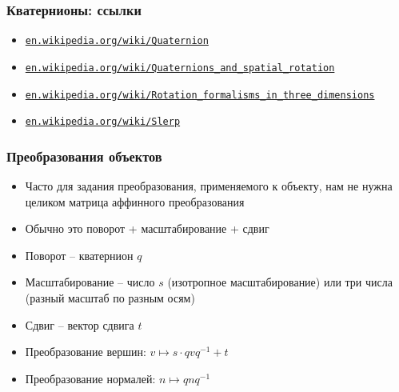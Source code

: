 \documentclass{beamer}
\begin{document}
\begin{frame}[fragile]
\frametitle{Кватернионы: ссылки}
\begin{itemize}
\item \href{https://en.wikipedia.org/wiki/Quaternion}{\nolinkurl{en.wikipedia.org/wiki/Quaternion}}
\item \href{https://en.wikipedia.org/wiki/Quaternions_and_spatial_rotation}{\nolinkurl{en.wikipedia.org/wiki/Quaternions\_and\_spatial\_rotation}}
\item \href{https://en.wikipedia.org/wiki/Rotation_formalisms_in_three_dimensions}{\nolinkurl{en.wikipedia.org/wiki/Rotation\_formalisms\_in\_three\_dimensions}}
\item \href{https://en.wikipedia.org/wiki/Slerp}{\nolinkurl{en.wikipedia.org/wiki/Slerp}}
\end{itemize}
\end{frame}

\begin{frame}[fragile]
\frametitle{Преобразования объектов}
\begin{itemize}
\item Часто для задания преобразования, применяемого к объекту, нам не нужна целиком матрица аффинного преобразования
\item Обычно это поворот + масштабирование + сдвиг
\pause
\item Поворот -- кватернион \begin{math}q\end{math}
\item Масштабирование -- число \begin{math}s\end{math} (изотропное масштабирование) или три числа (разный масштаб по разным осям)
\item Сдвиг -- вектор сдвига \begin{math}t\end{math}
\pause
\item Преобразование вершин: \begin{math}v \mapsto s \cdot qvq^{-1} + t\end{math}
\pause
\item Преобразование нормалей: \begin{math}n \mapsto qnq^{-1}\end{math}
\end{itemize}
\end{frame}
\end{document}
